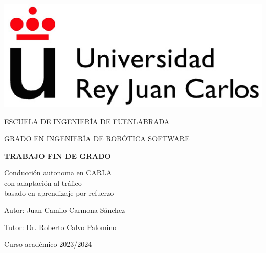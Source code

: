 \thispagestyle{empty}

\begin{titlepage}
	\begin{center}
		\vspace*{3mm}
		\begin{center}
			\includegraphics[width=0.4\linewidth]{imagenes/cap1/logo_urjc}
		\end{center}
		\vspace{6.0mm}
		
		\fontsize{15.5}{14}\selectfont ESCUELA DE INGENIERÍA DE FUENLABRADA
		\vspace{13mm}
		
		\fontsize{14}{14}\selectfont GRADO EN INGENIERÍA DE ROBÓTICA SOFTWARE
		
		\vspace{70pt}
		
		\fontsize{15.7}{14}\selectfont \textbf{TRABAJO FIN DE GRADO} 
		
		\vspace{20mm}
		\begin{LARGE}
			Conducción autonoma en CARLA \\
			 con adaptación al tráfico  \\
			basado en aprendizaje por refuerzo
		\end{LARGE}
		
		\vspace{20mm}
		
		\begin{large}
			Autor: Juan Camilo Carmona Sánchez
			
			Tutor: Dr. Roberto Calvo Palomino
			
			\vspace{10mm}
		\end{large}
		\begin{normalsize}
			Curso académico 2023/2024		
		\end{normalsize}
		\vspace{10mm}
		
	\end{center}
	
\end{titlepage}

\thispagestyle{empty}
